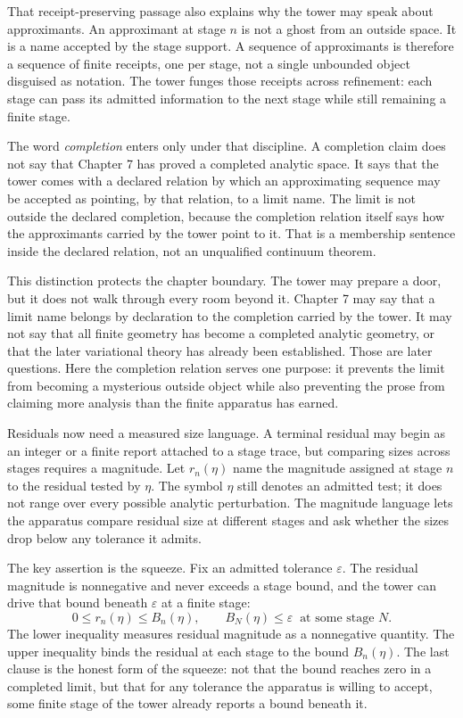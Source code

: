 That receipt-preserving passage also explains why the tower may speak about
approximants. An approximant at stage \(n\) is not a ghost from an outside
space. It is a name accepted by the stage support. A sequence of approximants
is therefore a sequence of finite receipts, one per stage, not a single
unbounded object disguised as notation. The tower funges those receipts
across refinement: each stage can pass its admitted information to
the next stage while still remaining a finite stage.

The word \emph{completion} enters only under that discipline. A completion claim
does not say that Chapter 7 has proved a completed analytic space. It says
that the tower comes with a declared relation by which an approximating
sequence may be accepted as pointing, by that relation, to a limit name. The limit is not
outside the declared completion, because the completion relation itself says
how the approximants carried by the tower point to it. That is a membership
sentence inside the declared relation, not an unqualified continuum theorem.

This distinction protects the chapter boundary. The tower may prepare a door,
but it does not walk through every room beyond it. Chapter 7 may say that a
limit name belongs by declaration to the completion carried by the tower. It
may not say that all finite geometry has become a completed analytic geometry,
or that the later variational theory has already been established. Those are
later questions. Here the completion relation serves one purpose: it prevents
the limit from becoming a mysterious outside object while also
preventing the prose from claiming more analysis than the finite apparatus has
earned.

Residuals now need a measured size language. A terminal residual may begin as
an integer or a finite report attached to a stage trace, but comparing sizes
across stages requires a magnitude. Let \(r_n(\eta)\) name the magnitude assigned at stage
\(n\) to the residual tested by \(\eta\). The symbol \(\eta\) still denotes an
admitted test; it does not range over every possible analytic perturbation.
The magnitude language lets the apparatus compare residual size at different
stages and ask whether the sizes drop below any tolerance it admits.

The key assertion is the squeeze. Fix an admitted tolerance \(\varepsilon\). The residual magnitude is nonnegative and never exceeds a stage bound, and the tower can drive that bound beneath \(\varepsilon\) at a finite stage:
\[
  0 \le r_n(\eta) \le B_n(\eta),
  \qquad
  B_N(\eta) \le \varepsilon \ \text{ at some stage } N .
\]
The lower inequality measures residual magnitude as a nonnegative quantity. The upper inequality binds the residual at each stage to the bound \(B_n(\eta)\). The last clause is the honest form of the squeeze: not that the bound reaches zero in a completed limit, but that for any tolerance the apparatus is willing to accept, some finite stage of the tower already reports a bound beneath it.

